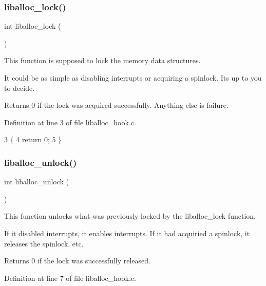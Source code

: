 \subsubsection{\texorpdfstring{liballoc\+\_\+lock()}{liballoc\_lock()}}
{\footnotesize\ttfamily int liballoc\+\_\+lock (\begin{DoxyParamCaption}{ }\end{DoxyParamCaption})}



This function is supposed to lock the memory data structures. 

It could be as simple as disabling interrupts or acquiring a spinlock. It\textquotesingle{}s up to you to decide.

\begin{DoxyReturn}{Returns}
0 if the lock was acquired successfully. Anything else is failure. 
\end{DoxyReturn}


Definition at line 3 of file liballoc\+\_\+hook.\+c.


\begin{DoxyCode}
3                     \{
4     \textcolor{keywordflow}{return} 0;
5 \}
\end{DoxyCode}
\mbox{\label{a00038_aedc23f198b2882d41d0caa316453967b_aedc23f198b2882d41d0caa316453967b}} 
\subsubsection{\texorpdfstring{liballoc\+\_\+unlock()}{liballoc\_unlock()}}
{\footnotesize\ttfamily int liballoc\+\_\+unlock (\begin{DoxyParamCaption}{ }\end{DoxyParamCaption})}



This function unlocks what was previously locked by the liballoc\+\_\+lock function. 

If it disabled interrupts, it enables interrupts. If it had acquiried a spinlock, it releases the spinlock. etc.

\begin{DoxyReturn}{Returns}
0 if the lock was successfully released. 
\end{DoxyReturn}


Definition at line 7 of file liballoc\+\_\+hook.\+c.


